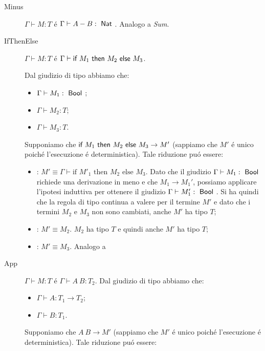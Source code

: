 \begin{description}
\item[Minus]
  $\Gamma \vdash{} M : T$ \'e $\Gamma \vdash{} A - B : \Nat$. Analogo a
  \emph{Sum}.

\item[IfThenElse] $\Gamma \vdash{} M : T$ \'e 
  $\Gamma \vdash{} \IF{M_1}{M_2}{M_3}$.
  
  Dal giudizio di tipo abbiamo che:

  \begin{itemize}
  	\item $\Gamma \vdash M_1 : \Bool$;
    \item $\Gamma \vdash{} M_2 : T$;
    \item $\Gamma \vdash{} M_3 : T$.
  \end{itemize}

  Supponiamo che $\IF{M_1}{M_2}{M_3} \to{} M'$ (sappiamo che $M'$ \'e unico poich\'e l'esecuzione
  \'e deterministica). Tale riduzione pu\'o essere:

  \begin{itemize}
    \item {}: $M' \equiv{} \Gamma \vdash{} \mbox{if } M'_1
      \mbox{ then } M_2 \mbox{ else } M_3$. Dato che il giudizio $\Gamma \vdash M_1 : \Bool$ richiede una derivazione in meno e che $M_1 \to M_1'$, possiamo applicare l'ipotesi induttiva per ottenere il giudizio $\Gamma \vdash M_1' : \Bool$. Si ha quindi che la regola di tipo  continua a valere per il termine $M'$ e dato che i termini $M_2$ e $M_3$ non sono cambiati, anche $M'$ ha tipo $T$;
    \item {}: $M' \equiv{} M_2$. $M_2$ ha tipo $T$ e quindi anche $M'$ ha tipo $T$;
    \item {}: $M' \equiv{} M_3$.  Analogo a 
  \end{itemize}
  
  
\item[App] $\Gamma \vdash{} M : T$ \'e  $\Gamma \vdash{} A \: B : T_2$.
  Dal giudizio di tipo abbiamo che:

  \begin{itemize}
    \item $\Gamma \vdash{} A : T_1 \to{} T_2$;
    \item $\Gamma \vdash{} B : T_1$.
  \end{itemize}

  Supponiamo che $A \: B \to{} M'$ (sappiamo che $M'$ \'e  unico poich\'e  l'esecuzione
  \'e  deterministica). Tale riduzione pu\'o essere:


\end{description}
